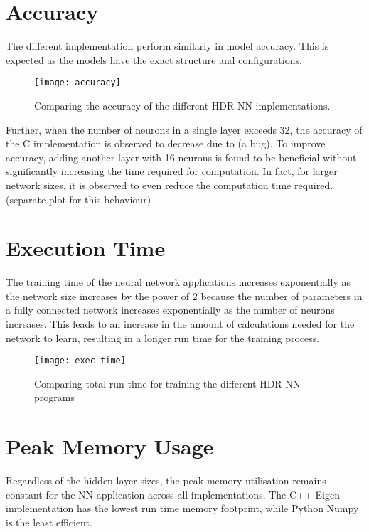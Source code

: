 


\section{Accuracy}
The different implementation perform similarly in model accuracy. This is expected as the models have the exact structure and configurations.
\begin{figure}[ht]
	\centering
	\texttt{[image: accuracy]}
	\caption[HDR-NN Accuracy]{Comparing the accuracy of the different HDR-NN implementations.}
\end{figure}

Further, when the number of neurons in a single layer exceeds 32, the accuracy of the C implementation is observed to decrease due to (a bug). To improve accuracy, adding another layer with 16 neurons is found to be beneficial without significantly increasing the time required for computation. In fact, for larger network sizes, it is observed to even reduce the computation time required. (separate plot for this behaviour)

\section{Execution Time}
The training time of the neural network applications increases exponentially as the network size increases by the power of 2 because the number of parameters in a fully connected network increases exponentially as the number of neurons increases. This leads to an increase in the amount of calculations needed for the network to learn, resulting in a longer run time for the training process.

\begin{figure}[ht]
	\centering
	\texttt{[image: exec-time]}
	\caption[Execution Time vs Model Parameters]{Comparing total run time for training the different HDR-NN programs}
\end{figure}


\section{Peak Memory Usage}
Regardless of the hidden layer sizes, the peak memory utilisation remains constant for the NN application across all implementations. The C++ Eigen implementation has the lowest run time memory footprint, while Python Numpy is the least efficient.

